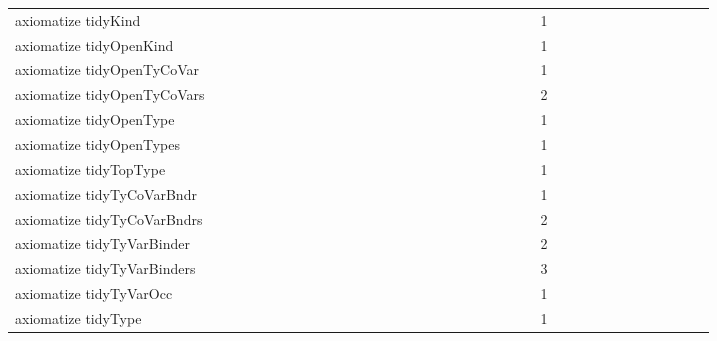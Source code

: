 {\begin{tabular}{l|rrr|rrr|rrr}
axiomatize tidyKind &  &  &  &  &  &  &  &  &  &  &  &  &  &  &  &  &  &  &  &  &  &  &  & 1 &  &  &  &  &  &  &  &  &  &  &  & \\
axiomatize tidyOpenKind &  &  &  &  &  &  &  &  &  &  &  &  &  &  &  &  &  &  &  &  &  &  &  & 1 &  &  &  &  &  &  &  &  &  &  &  & \\
axiomatize tidyOpenTyCoVar &  &  &  &  &  &  &  &  &  &  &  &  &  &  &  &  &  &  &  &  &  &  &  & 1 &  &  &  &  &  &  &  &  &  &  &  & \\
axiomatize tidyOpenTyCoVars &  &  &  &  &  &  &  &  &  &  &  &  &  &  &  &  &  &  &  &  &  &  &  & 2 &  &  &  &  &  &  &  &  &  &  &  & \\
axiomatize tidyOpenType &  &  &  &  &  &  &  &  &  &  &  &  &  &  &  &  &  &  &  &  &  &  &  & 1 &  &  &  &  &  &  &  &  &  &  &  & \\
axiomatize tidyOpenTypes &  &  &  &  &  &  &  &  &  &  &  &  &  &  &  &  &  &  &  &  &  &  &  & 1 &  &  &  &  &  &  &  &  &  &  &  & \\
axiomatize tidyTopType &  &  &  &  &  &  &  &  &  &  &  &  &  &  &  &  &  &  &  &  &  &  &  & 1 &  &  &  &  &  &  &  &  &  &  &  & \\
axiomatize tidyTyCoVarBndr &  &  &  &  &  &  &  &  &  &  &  &  &  &  &  &  &  &  &  &  &  &  &  & 1 &  &  &  &  &  &  &  &  &  &  &  & \\
axiomatize tidyTyCoVarBndrs &  &  &  &  &  &  &  &  &  &  &  &  &  &  &  &  &  &  &  &  &  &  &  & 2 &  &  &  &  &  &  &  &  &  &  &  & \\
axiomatize tidyTyVarBinder &  &  &  &  &  &  &  &  &  &  &  &  &  &  &  &  &  &  &  &  &  &  &  & 2 &  &  &  &  &  &  &  &  &  &  &  & \\
axiomatize tidyTyVarBinders &  &  &  &  &  &  &  &  &  &  &  &  &  &  &  &  &  &  &  &  &  &  &  & 3 &  &  &  &  &  &  &  &  &  &  &  & \\
axiomatize tidyTyVarOcc &  &  &  &  &  &  &  &  &  &  &  &  &  &  &  &  &  &  &  &  &  &  &  & 1 &  &  &  &  &  &  &  &  &  &  &  & \\
axiomatize tidyType &  &  &  &  &  &  &  &  &  &  &  &  &  &  &  &  &  &  &  &  &  &  &  & 1 &  &  &  &  &  &  &  &  &  &  &  & \\

\end{tabular}}
